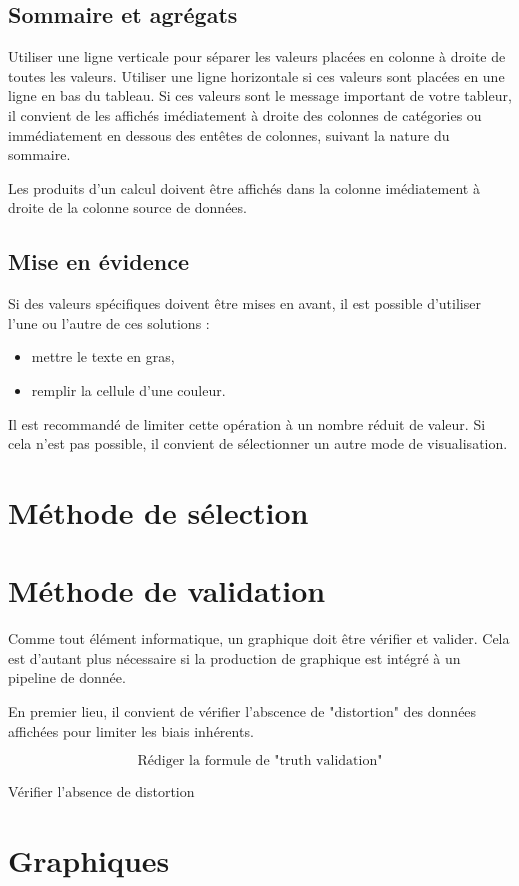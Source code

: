 \documentclass[a4paper,12pt]{article}
\begin{document}
\begin{multicols}{2}
\subsection*{Sommaire et agrégats}
\label{sec:orge04e6e6}
Utiliser une ligne verticale pour séparer les valeurs placées en colonne à droite de toutes les valeurs.
Utiliser une ligne horizontale si ces valeurs sont placées en une ligne en bas du tableau.
Si ces valeurs sont le message important de votre tableur, il convient de les affichés imédiatement à droite des colonnes de catégories ou immédiatement en dessous des entêtes de colonnes, suivant la nature du sommaire.

Les produits d'un calcul doivent être affichés dans la colonne imédiatement à droite de la colonne source de données.
\subsection*{Mise en évidence}
\label{sec:orgc560c06}
Si des valeurs spécifiques doivent être mises en avant, il est possible d'utiliser l'une ou l'autre de ces solutions :
\begin{itemize}
\item mettre le texte en gras,
\item remplir la cellule d'une couleur.
\end{itemize}
Il est recommandé de limiter cette opération à un nombre réduit de valeur. Si cela n'est pas possible, il convient de sélectionner un autre mode de visualisation.
\section*{Méthode de sélection}
\label{sec:orga8211d2}
\section*{Méthode de validation}
\label{sec:orgadd3615}
Comme tout élément informatique, un graphique doit être vérifier et valider. Cela est d'autant plus nécessaire si la production de graphique est intégré à un pipeline de donnée.

En premier lieu, il convient de vérifier l'abscence de "distortion" des données affichées pour limiter les biais inhérents.\autocite{Few2012p192}

$$ \text{Rédiger la formule de "truth validation"}$$

Vérifier l'absence de distortion
\section*{Graphiques}
\label{sec:org3db1129}

\end{multicols}
\end{document}

